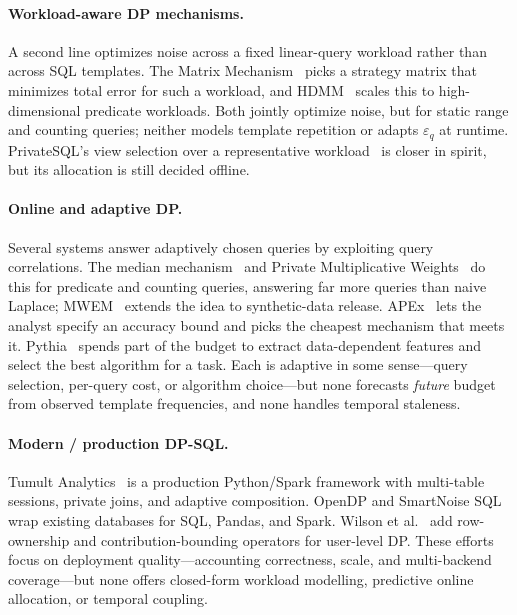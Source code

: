 \documentclass[sigconf,nonacm]{acmart}
\newcommand{\eps}{\varepsilon}
\begin{document}
\paragraph{Workload-aware DP mechanisms.}
A second line optimizes noise across a fixed linear-query workload rather than across SQL templates. The Matrix Mechanism~\cite{li2010mm} picks a strategy matrix that minimizes total error for such a workload, and HDMM~\cite{mckenna2018hdmm} scales this to high-dimensional predicate workloads. Both jointly optimize noise, but for static range and counting queries; neither models template repetition or adapts $\eps_q$ at runtime. PrivateSQL's view selection over a representative workload~\cite{kotsogiannis2019privatesql} is closer in spirit, but its allocation is still decided offline.

\paragraph{Online and adaptive DP.}
Several systems answer adaptively chosen queries by exploiting query correlations. The median mechanism~\cite{rothroughgarden2010median} and Private Multiplicative Weights~\cite{hardtrothblum2010pmw} do this for predicate and counting queries, answering far more queries than naive Laplace; MWEM~\cite{hardtligett2012mwem} extends the idea to synthetic-data release. APEx~\cite{ge2019apex} lets the analyst specify an accuracy bound and picks the cheapest mechanism that meets it. Pythia~\cite{kotsogiannis2017pythia} spends part of the budget to extract data-dependent features and select the best algorithm for a task. Each is adaptive in some sense---query selection, per-query cost, or algorithm choice---but none forecasts \emph{future} budget from observed template frequencies, and none handles temporal staleness.

\paragraph{Modern / production DP-SQL.}
Tumult Analytics~\cite{berghel2022tumult} is a production Python/Spark framework with multi-table sessions, private joins, and adaptive composition. OpenDP and SmartNoise SQL~\cite{opendp2023} wrap existing databases for SQL, Pandas, and Spark. Wilson et al.~\cite{wilson2020bounded} add row-ownership and contribution-bounding operators for user-level DP. These efforts focus on deployment quality---accounting correctness, scale, and multi-backend coverage---but none offers closed-form workload modelling, predictive online allocation, or temporal coupling.
\end{document}
